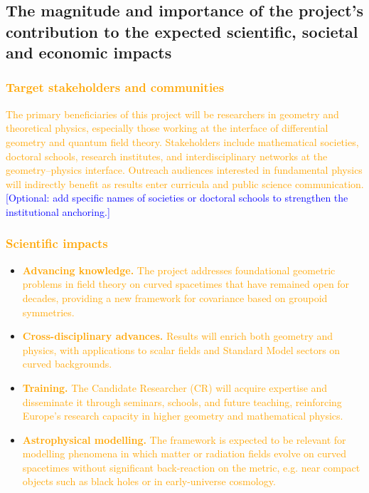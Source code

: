 \documentclass[11pt,draftproposal]{msca-pf}
\begin{document}

\subsection{The magnitude and importance of the project's contribution to the
    expected scientific, societal and economic impacts}
\label{ssc:impact: future}

\subsubsection*{\textcolor{orange}{Target stakeholders and communities}}
\textcolor{orange}{The primary beneficiaries of this project will be researchers in geometry and theoretical physics, especially those working at the interface of differential geometry and quantum field theory. Stakeholders include mathematical societies, doctoral schools, research institutes, and interdisciplinary networks at the geometry–physics interface. Outreach audiences interested in fundamental physics will indirectly benefit as results enter curricula and public science communication.}
\textcolor{blue}{[Optional: add specific names of societies or doctoral schools to strengthen the institutional anchoring.]}

\subsubsection*{\textcolor{orange}{Scientific impacts}}
\begin{itemize}[noitemsep,topsep=2pt]
  \item \textcolor{orange}{\textbf{Advancing knowledge.} The project addresses foundational geometric problems in field theory on curved spacetimes that have remained open for decades, providing a new framework for covariance based on groupoid symmetries.}
  \item \textcolor{orange}{\textbf{Cross-disciplinary advances.} Results will enrich both geometry and physics, with applications to scalar fields and Standard Model sectors on curved backgrounds.}
  \item \textcolor{orange}{\textbf{Training.} The Candidate Researcher (CR) will acquire expertise and disseminate it through seminars, schools, and future teaching, reinforcing Europe’s research capacity in higher geometry and mathematical physics.}
  \item \textcolor{orange}{\textbf{Astrophysical modelling.} The framework is expected to be relevant for modelling phenomena in which matter or radiation fields evolve on curved spacetimes without significant back-reaction on the metric, e.g. near compact objects such as black holes or in early-universe cosmology.}
\end{itemize}
\end{document}
